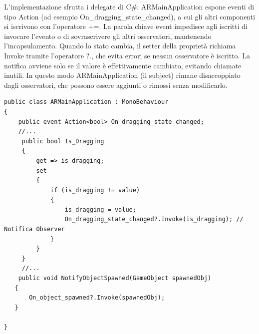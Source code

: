 L’implementazione sfrutta i delegate di C\#: ARMainApplication espone eventi di tipo Action (ad esempio On\_dragging\_state\_changed), a cui gli altri componenti si iscrivono con l’operatore +=. La parola chiave event impedisce agli iscritti di invocare l’evento o di sovrascrivere gli altri osservatori, mantenendo l’incapsulamento. Quando lo stato cambia, il setter della proprietà richiama Invoke tramite l’operatore ?., che evita errori se nessun osservatore è iscritto. La notifica avviene solo se il valore è effettivamente cambiato, evitando chiamate inutili. In questo modo ARMainApplication (il subject) rimane disaccoppiato dagli osservatori, che possono essere aggiunti o rimossi senza modificarlo.

\begin{lstlisting}[language={[Sharp]C}]
public class ARMainApplication : MonoBehaviour
{
    public event Action<bool> On_dragging_state_changed;
    //...
     public bool Is_Dragging
     {
         get => is_dragging;
         set
         {
             if (is_dragging != value)
             {
                 is_dragging = value;
                 On_dragging_state_changed?.Invoke(is_dragging); // Notifica Observer
             }
         }
     }
     //...
    public void NotifyObjectSpawned(GameObject spawnedObj)
   {
       On_object_spawned?.Invoke(spawnedObj);
   }

}

\end{lstlisting}

